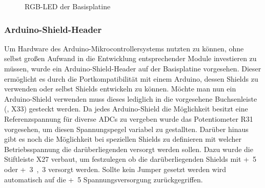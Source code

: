 \begin{figure}[htb]
    \centering
    \qquad
    \qquad
    \caption[RGB-LED der Basisplatine]{RGB-LED der \gls{Basisplatine}}
    \label{fig:basisplatine-rgbled}
\end{figure}

\subsubsection{Arduino-Shield-Header}
Um Hardware des Arduino-Mikrocontrollersystems nutzten zu können, ohne selbst großen Aufwand in die Entwicklung entsprechender Module investieren zu müssen, wurde ein Arduino-Shield-Header auf der \gls{Basisplatine} vorgesehen. Dieser ermöglicht es durch die Portkompatibilität mit einem Arduino, dessen Shields zu verwenden oder selbst Shields entwickeln zu können. Möchte man nun ein Arduino-Shield verwenden muss dieses lediglich in die vorgesehene Buchsenleiste (, X33) gesteckt werden. Da jedes Arduino-Shield die Möglichkeit besitzt eine Referenzspannung für diverse ADCs zu vergeben wurde das Potentiometer R31 vorgesehen, um diesen Spannungspegel variabel zu gestallten. Darüber hinaus gibt es noch die Möglichkeit bei speziellen Shields zu definieren mit welcher Betriebsspannung die darüberliegenden versorgt werden sollen. Dazu wurde die Stiftleiste X27 verbaut, um festzulegen ob die darüberliegenden Shields mit \unit{+5}{\volt} oder \unit{+3,3}{\volt} versorgt werden. Sollte kein Jumper gesetzt werden wird automatisch auf die \unit{+5}{\volt} Spannungsversorgung zurückgegriffen.

